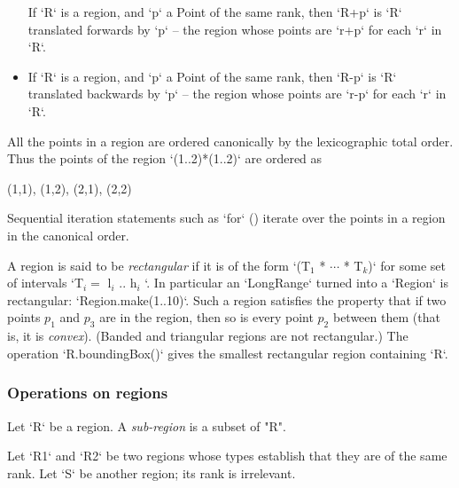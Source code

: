 \begin{itemize}
  If \xcd`R` is a region, and \xcd`p` a Point of the same rank, then 
  \xcd`R+p` is \xcd`R` translated forwards by 
  \xcd`p` -- the region whose
  points are \xcd`r+p` 
  for each \xcd`r` in \xcd`R`.
\item 
  If \xcd`R` is a region, and \xcd`p` a Point of the same rank, then 
  \xcd`R-p` is \xcd`R` translated backwards by 
  \xcd`p` -- the region whose
  points are \xcd`r-p` 
  for each \xcd`r` in \xcd`R`.

\end{itemize}

All the points in a region are ordered canonically by the
lexicographic total order. Thus the points of the region \xcd`(1..2)*(1..2)`
are ordered as 
\begin{xten}
(1,1), (1,2), (2,1), (2,2)
\end{xten}
Sequential iteration statements such as \xcd`for` ()
iterate over the points in a region in the canonical order.

A region is said to be {\em rectangular} if it is of
the form \xcdmath`(T$_1$ * $\cdots$ * T$_k$)` for some set of intervals
\xcdmath`T$_i = $ l$_i$ .. h$_i$ `. 
In particular an \xcd`LongRange` turned into a \xcd`Region` is rectangular: 
\xcd`Region.make(1..10)`.
Such a
region satisfies the property that if two points $p_1$ and $p_3$ are
in the region, then so is every point $p_2$ between them (that is, it is {\em convex}). 
(Banded and triangular regions are not rectangular.)
The operation
\xcd`R.boundingBox()` gives the smallest rectangular region containing
\xcd`R`.

\subsubsection{Operations on regions}

Let \xcd`R` be a region. A {\em sub-region} is a subset of \xcd"R".

Let \xcdmath`R1` and \xcdmath`R2` be two regions whose types establish that
they are of the same rank. Let \xcdmath`S` be another region; its rank is
irrelevant. 

